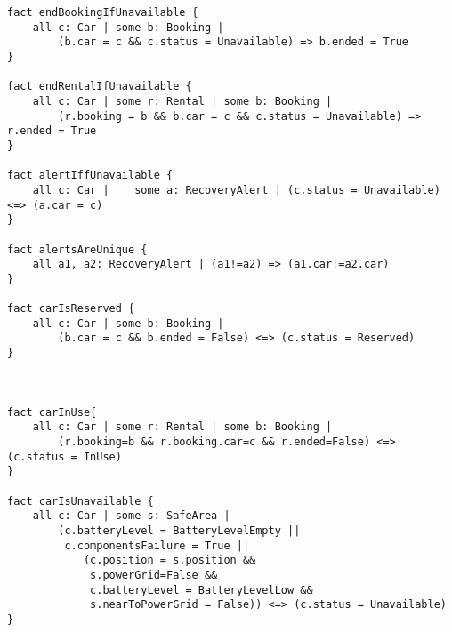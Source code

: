 \begin{lstlisting}
fact endBookingIfUnavailable {
	all c: Car | some b: Booking |
		(b.car = c && c.status = Unavailable) => b.ended = True
}

fact endRentalIfUnavailable {
	all c: Car | some r: Rental | some b: Booking |
		(r.booking = b && b.car = c && c.status = Unavailable) => r.ended = True
}

fact alertIffUnavailable {
	all c: Car |	some a: RecoveryAlert | (c.status = Unavailable) <=> (a.car = c)
}

fact alertsAreUnique {
	all a1, a2: RecoveryAlert | (a1!=a2) => (a1.car!=a2.car)
}

fact carIsReserved {
	all c: Car | some b: Booking |
		(b.car = c && b.ended = False) <=> (c.status = Reserved)
}



fact carInUse{
	all c: Car | some r: Rental | some b: Booking |
		(r.booking=b && r.booking.car=c && r.ended=False) <=> (c.status = InUse)
}

fact carIsUnavailable {
	all c: Car | some s: SafeArea |
		(c.batteryLevel = BatteryLevelEmpty ||
		 c.componentsFailure = True || 
			(c.position = s.position &&
			 s.powerGrid=False &&
			 c.batteryLevel = BatteryLevelLow &&
			 s.nearToPowerGrid = False)) <=> (c.status = Unavailable)
}
\end{lstlisting}